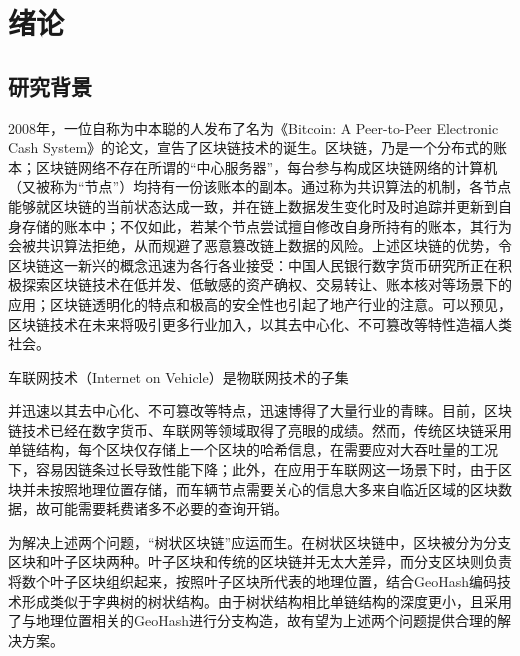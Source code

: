 %
%
%
%
%
%

\chapter{绪论}

\section{研究背景}

2008年，一位自称为中本聪的人发布了名为《Bitcoin: A Peer-to-Peer Electronic Cash System》的论文，宣告了区块链技术的诞生。区块链，乃是一个分布式的账本；区块链网络不存在所谓的“中心服务器”，每台参与构成区块链网络的计算机（又被称为“节点”）均持有一份该账本的副本。通过称为共识算法的机制，各节点能够就区块链的当前状态达成一致，并在链上数据发生变化时及时追踪并更新到自身存储的账本中；不仅如此，若某个节点尝试擅自修改自身所持有的账本，其行为会被共识算法拒绝，从而规避了恶意篡改链上数据的风险。上述区块链的优势，令区块链这一新兴的概念迅速为各行各业接受：中国人民银行数字货币研究所正在积极探索区块链技术在低并发、低敏感的资产确权、交易转让、账本核对等场景下的应用\cite{shuYanSuo}；区块链透明化的特点和极高的安全性也引起了地产行业的注意\cite{usageOfBC}。可以预见，区块链技术在未来将吸引更多行业加入，以其去中心化、不可篡改等特性造福人类社会。

车联网技术（Internet on Vehicle）是物联网技术的子集

并迅速以其去中心化、不可篡改等特点，迅速博得了大量行业的青睐。目前，区块链技术已经在数字货币、车联网等领域取得了亮眼的成绩。然而，传统区块链采用单链结构，每个区块仅存储上一个区块的哈希信息，在需要应对大吞吐量的工况下，容易因链条过长导致性能下降；此外，在应用于车联网这一场景下时，由于区块并未按照地理位置存储，而车辆节点需要关心的信息大多来自临近区域的区块数据，故可能需要耗费诸多不必要的查询开销。

为解决上述两个问题，“树状区块链”应运而生。在树状区块链中，区块被分为分支区块和叶子区块两种。叶子区块和传统的区块链并无太大差异，而分支区块则负责将数个叶子区块组织起来，按照叶子区块所代表的地理位置，结合GeoHash编码技术形成类似于字典树的树状结构。由于树状结构相比单链结构的深度更小，且采用了与地理位置相关的GeoHash进行分支构造，故有望为上述两个问题提供合理的解决方案。

